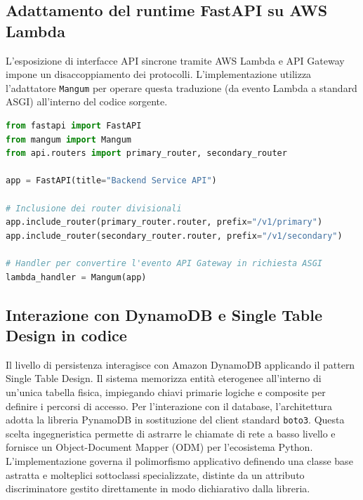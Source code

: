 \subsection{Adattamento del runtime FastAPI su AWS Lambda}

L'esposizione di interfacce API sincrone tramite AWS Lambda e API Gateway impone un disaccoppiamento dei protocolli. L'implementazione utilizza l'adattatore \texttt{Mangum} per operare questa traduzione (da evento Lambda a standard ASGI) all'interno del codice sorgente.

\begin{lstlisting}[language=Python, caption={Involucro dell'applicazione FastAPI tramite l'adattatore Mangum per l'esecuzione serverless}, label={lst:mangum-adapter}]
from fastapi import FastAPI
from mangum import Mangum
from api.routers import primary_router, secondary_router

app = FastAPI(title="Backend Service API")

# Inclusione dei router divisionali
app.include_router(primary_router.router, prefix="/v1/primary")
app.include_router(secondary_router.router, prefix="/v1/secondary")

# Handler per convertire l'evento API Gateway in richiesta ASGI
lambda_handler = Mangum(app)
\end{lstlisting}

\subsection{Interazione con DynamoDB e Single Table Design in codice}

Il livello di persistenza interagisce con Amazon DynamoDB applicando il pattern Single Table Design. Il sistema memorizza entità eterogenee all'interno di un'unica tabella fisica, impiegando chiavi primarie logiche e composite per definire i percorsi di accesso. Per l'interazione con il database, l'architettura adotta la libreria PynamoDB \cite{Pynamodb} in sostituzione del client standard \texttt{boto3}. Questa scelta ingegneristica permette di astrarre le chiamate di rete a basso livello e fornisce un Object-Document Mapper (ODM) per l'ecosistema Python. L'implementazione governa il polimorfismo applicativo definendo una classe base astratta e molteplici sottoclassi specializzate, distinte da un attributo discriminatore gestito direttamente in modo dichiarativo dalla libreria.

